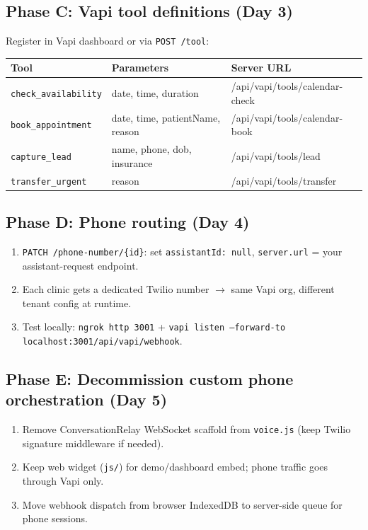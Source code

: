 \documentclass[11pt,a4paper]{article}
\begin{document}
\subsection{Phase C: Vapi tool definitions (Day 3)}
Register in Vapi dashboard or via \texttt{POST /tool}:

\begin{center}
\small
\begin{tabular}{@{}lll@{}}
\toprule
\textbf{Tool} & \textbf{Parameters} & \textbf{Server URL} \\
\midrule
\texttt{check\_availability} & date, time, duration & /api/vapi/tools/calendar-check \\
\texttt{book\_appointment} & date, time, patientName, reason & /api/vapi/tools/calendar-book \\
\texttt{capture\_lead} & name, phone, dob, insurance & /api/vapi/tools/lead \\
\texttt{transfer\_urgent} & reason & /api/vapi/tools/transfer \\
\bottomrule
\end{tabular}
\end{center}

\subsection{Phase D: Phone routing (Day 4)}
\begin{enumerate}
  \item \texttt{PATCH /phone-number/\{id\}}: set \texttt{assistantId: null}, \texttt{server.url} = your assistant-request endpoint.
  \item Each clinic gets a dedicated Twilio number $\rightarrow$ same Vapi org, different tenant config at runtime.
  \item Test locally: \texttt{ngrok http 3001} + \texttt{vapi listen --forward-to localhost:3001/api/vapi/webhook}.
\end{enumerate}

\subsection{Phase E: Decommission custom phone orchestration (Day 5)}
\begin{enumerate}
  \item Remove ConversationRelay WebSocket scaffold from \texttt{voice.js} (keep Twilio signature middleware if needed).
  \item Keep web widget (\texttt{js/}) for demo/dashboard embed; phone traffic goes through Vapi only.
  \item Move webhook dispatch from browser IndexedDB to server-side queue for phone sessions.
\end{enumerate}
\end{document}

